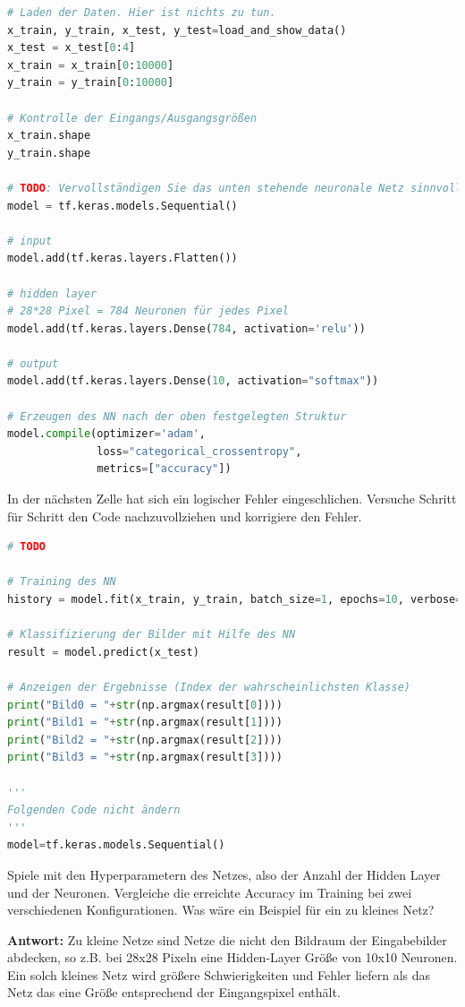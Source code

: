 \documentclass[a4paper,10pt,titlepage]{scrartcl}
\begin{document}
\begin{lstlisting}[language=python]
# Laden der Daten. Hier ist nichts zu tun.
x_train, y_train, x_test, y_test=load_and_show_data()
x_test = x_test[0:4]
x_train = x_train[0:10000]
y_train = y_train[0:10000]

# Kontrolle der Eingangs/Ausgangsgrößen
x_train.shape
y_train.shape

# TODO: Vervollständigen Sie das unten stehende neuronale Netz sinnvoll.
model = tf.keras.models.Sequential()

# input
model.add(tf.keras.layers.Flatten())

# hidden layer
# 28*28 Pixel = 784 Neuronen für jedes Pixel
model.add(tf.keras.layers.Dense(784, activation='relu'))

# output
model.add(tf.keras.layers.Dense(10, activation="softmax"))

# Erzeugen des NN nach der oben festgelegten Struktur
model.compile(optimizer='adam',
              loss="categorical_crossentropy",
              metrics=["accuracy"])
\end{lstlisting}

In der nächsten Zelle hat sich ein logischer Fehler eingeschlichen. Versuche Schritt für Schritt den Code nachzuvollziehen und korrigiere den Fehler.

\begin{lstlisting}[language=python]
# TODO

# Training des NN
history = model.fit(x_train, y_train, batch_size=1, epochs=10, verbose=1)

# Klassifizierung der Bilder mit Hilfe des NN
result = model.predict(x_test)

# Anzeigen der Ergebnisse (Index der wahrscheinlichsten Klasse)
print("Bild0 = "+str(np.argmax(result[0])))
print("Bild1 = "+str(np.argmax(result[1])))
print("Bild2 = "+str(np.argmax(result[2])))
print("Bild3 = "+str(np.argmax(result[3])))

'''
Folgenden Code nicht ändern
'''
model=tf.keras.models.Sequential()
\end{lstlisting}
Spiele mit den Hyperparametern des Netzes, also der Anzahl der Hidden Layer und der Neuronen. Vergleiche die erreichte Accuracy im Training bei zwei verschiedenen Konfigurationen. Was wäre ein Beispiel für ein zu kleines Netz?

\textbf{Antwort:} Zu kleine Netze sind Netze die nicht den Bildraum der Eingabebilder abdecken, so z.B. bei 28x28 Pixeln eine Hidden-Layer Größe von 10x10 Neuronen. Ein solch kleines Netz wird größere Schwierigkeiten und Fehler liefern als das Netz das eine Größe entsprechend der Eingangspixel enthält.
\end{document}
